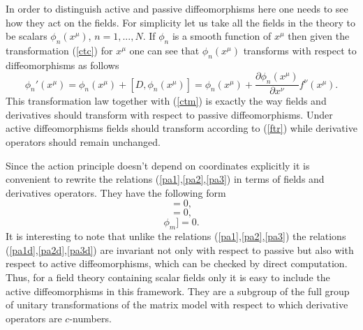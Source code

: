 \documentclass[a4paper,11pt]{article}
\begin{document}
In order to distinguish active and passive diffeomorphisms here
one needs to see how they act on the fields. For simplicity let us
take all the fields in the theory to be scalars $\phi_n (x^\mu)$,
$n=1,...,N$. If $\phi_n$ is a smooth function of $x^\mu$ then
given the transformation (\ref{ctc}) for $x^\mu$ one can see that
$\phi_n (x^\mu)$ transforms with respect to diffeomorphisms as
follows
\begin{equation}
{\phi_n}' (x^\mu)=\phi_n (x^\mu)+[D,\phi_n (x^\mu)]=\phi_n
(x^\mu)+\frac{\partial \phi_n (x^\mu)}{\partial
x^\nu}f^\nu(x^\mu). \label{ftr}
\end{equation}
This transformation law together with (\ref{ctm}) is exactly the
way fields and derivatives should transform with respect to
passive diffeomorphisms. Under active diffeomorphisms fields
should transform according to (\ref{ftr}) while derivative
operators should remain unchanged.


Since the action principle doesn't depend on coordinates
explicitly it is convenient to rewrite the relations
(\ref{pa1},\ref{pa2},\ref{pa3}) in terms of fields and derivatives
operators. They have the following form
\begin{equation}
[\phi_n,\phi_m]=0, \label{pa1d}
\end{equation}
\begin{equation}
[\partial_\mu,\partial_\nu]=0, \label{pa2d}
\end{equation}
\begin{equation}
[[\partial_\mu,\phi_n]\phi_m]=0. \label{pa3d}
\end{equation}
It is interesting to note that unlike the relations
(\ref{pa1},\ref{pa2},\ref{pa3}) the relations
(\ref{pa1d},\ref{pa2d},\ref{pa3d}) are invariant not only with
respect to passive but also with respect to active
diffeomorphisms, which can be checked by direct computation. Thus,
for a field theory containing scalar fields only it is easy to
include the active diffeomorphisms in this framework. They are a
subgroup of the full group of unitary transformations of the
matrix model with respect to which derivative operators are
$c$-numbers.
\end{document}
